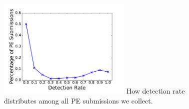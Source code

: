 \begin{figure}[t!]
\begin{center}
\includegraphics[width=2.5in]{figure/DetectionRate}
{
How detection rate distributes among all PE submissions we collect.
}
\end{center}
\end{figure}
